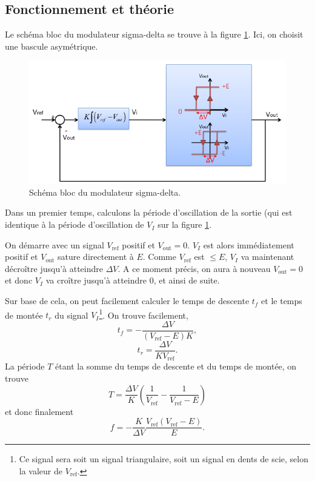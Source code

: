 

\subsection{Fonctionnement et théorie}
Le schéma bloc du modulateur sigma-delta se trouve
à la figure \ref{fig:sigma-delta-schema-blocs}. Ici,
on choisit une bascule asymétrique.

\begin{figure}[ht]
	\centering
	\includegraphics[scale=0.75]{img/schema-blocs.png}
	\caption{Schéma bloc du modulateur sigma-delta.}
	\label{fig:sigma-delta-schema-blocs}
\end{figure}

Dans un premier temps, calculons la période
d'oscillation de la sortie (qui est identique
à la période d'oscillation de $V_I$ sur la figure
\ref{fig:sigma-delta-schema-blocs}.

On démarre avec un signal $V_{\text{ref}}$ positif et
$V_{\text{out}} = 0$. $V_I$ est alors immédiatement positif
et $V_{\text{out}}$ sature directement à $E$. Comme $V_{\text{ref}}$
est $\leq E$, $V_I$ va maintenant décroître jusqu'à atteindre
$\Delta V$. A ce moment précis, on aura à nouveau $V_{\text{out}} = 0$
et donc $V_I$ va croître jusqu'à atteindre 0, et ainsi de suite.

Sur base de cela, on peut facilement calculer
le temps de descente $t_f$ et le temps de montée $t_r$
du signal $V_I$\footnote{Ce signal sera soit un signal triangulaire,
soit un signal en dents de scie, selon la valeur de $V_{\text{ref}}$.}.
On trouve facilement,
\[ t_f = -\frac{\Delta V}{(V_{\text{ref}} - E)K},\]
\[ t_r = \frac{\Delta V}{KV_{\text{ref}}}.\]
La période $T$ étant la somme du temps de descente et du temps
de montée, on trouve
\[ T = \frac{\Delta V}{K}\left(\frac{1}{V_{\text{ref}}} - \frac{1}{V_{\text{ref}} - E}\right)\]
et donc finalement
\begin{equation} 
	f = -\frac{K}{\Delta V} \frac{V_{\text{ref}}(V_{\text{ref}}-E)}{E}.
	\label{eq:sigma-delta-frequency}
\end{equation}

